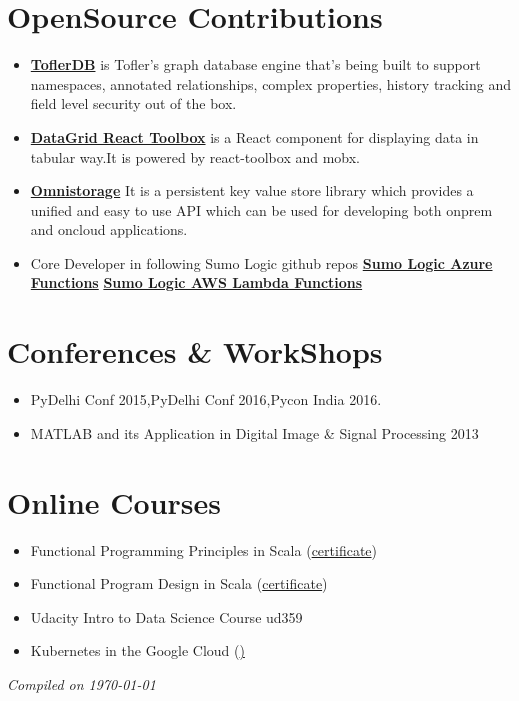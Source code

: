 \documentclass[margin,line]{resume}
\begin{document}
\begin{resume}
\section{\mysidestyle OpenSource Contributions}
\vspace{0mm}
    \begin{itemize}
                \item \href{https://github.com/tofler/toflerdb}{\textbf{ToflerDB}} is Tofler's graph database engine that's being built to support namespaces, annotated relationships, complex properties, history tracking and field level security out of the box.
                \item \href{https://github.com/tofler/datagrid-react-toolbox}{\textbf{DataGrid React Toolbox}} is a React component for displaying data in tabular way.It is powered by react-toolbox and mobx.
                \item \href{https://github.com/Sumologic/sumologic-omnistorage}{\textbf{Omnistorage}} It is a persistent key value store library which provides a unified and easy to use API which can be used for developing both onprem and oncloud applications.
                \item Core Developer in following Sumo Logic github repos
                \subitem \href{https://github.com/SumoLogic/sumologic-azure-function}{\textbf{Sumo Logic Azure Functions}}
                \subitem \href{https://github.com/SumoLogic/sumologic-aws-lambda}{\textbf{Sumo Logic AWS Lambda Functions}}

    \end{itemize}
\section{\mysidestyle Conferences \& WorkShops}
\vspace{0mm}
    \begin{itemize}
           \item PyDelhi Conf 2015,PyDelhi Conf 2016,Pycon India 2016.
           \item MATLAB and its Application in Digital Image \& Signal Processing 2013
    \end{itemize}

\section{\mysidestyle Online Courses}
\vspace{0mm}
    \begin{itemize}
        \item Functional Programming Principles in Scala (\href{https://www.coursera.org/account/accomplishments/verify/AU47C6WSX6NR}{certificate})
        \item Functional Program Design in Scala (\href{https://www.coursera.org/account/accomplishments/certificate/VUBNK7HMZENA}{certificate})
        \item Udacity Intro to Data Science Course ud359
        \item Kubernetes in the Google Cloud (\href{https://google.qwiklabs.com/quests/29})
    \end{itemize}

\hfill \textsl{Compiled on \monthyeardate\today}
%
\end{resume}
\end{document}
